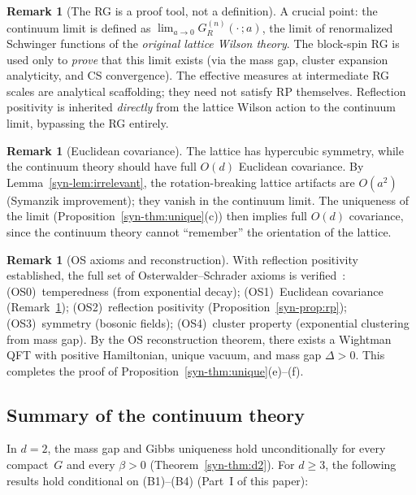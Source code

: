 \documentclass[11pt]{article}
\theoremstyle{definition}
\newtheorem{remark}[theorem]{Remark}
\begin{document}
\begin{remark}[The RG is a proof tool, not a definition]
\label{syn-rem:rg_tool}
A crucial point: the continuum limit is defined as
$\lim_{a \to 0} G_R^{(n)}(\cdot\,;a)$, the limit
of renormalized Schwinger functions of the
\emph{original lattice Wilson theory}.  The block-spin RG
is used only to \emph{prove} that this limit exists
(via the mass gap, cluster expansion analyticity, and CS
convergence).  The effective measures at intermediate RG
scales are analytical scaffolding; they need not satisfy
RP themselves.  Reflection positivity is inherited
\emph{directly} from the lattice Wilson action to the
continuum limit, bypassing the RG entirely.
\end{remark}

\begin{remark}[Euclidean covariance]
\label{syn-rem:euclidean}
The lattice has hypercubic symmetry, while the continuum
theory should have full $O(d)$ Euclidean covariance.
By Lemma~\ref{syn-lem:irrelevant}, the rotation-breaking
lattice artifacts are $O(a^2)$ (Symanzik improvement);
they vanish in the continuum limit.  The uniqueness of
the limit (Proposition~\ref{syn-thm:unique}(c)) then implies
full $O(d)$ covariance, since the continuum theory cannot
``remember'' the orientation of the lattice.
\end{remark}

\begin{remark}[OS axioms and reconstruction]
\label{syn-rem:os}
With reflection positivity established, the full set of
Osterwalder--Schrader axioms is
verified~\cite{OsterwalderSchrader}:
\textup{(OS0)}~temperedness (from exponential decay);
\textup{(OS1)}~Euclidean covariance (Remark~\ref{syn-rem:euclidean});
\textup{(OS2)}~reflection positivity (Proposition~\ref{syn-prop:rp});
\textup{(OS3)}~symmetry (bosonic fields);
\textup{(OS4)}~cluster property (exponential clustering from
mass gap).
By the OS reconstruction theorem, there exists a
Wightman QFT with positive Hamiltonian, unique vacuum, and
mass gap $\Delta > 0$.  This completes the proof of
Proposition~\ref{syn-thm:unique}(e)--(f).
\end{remark}

\subsection{Summary of the continuum theory}

In $d = 2$, the mass gap and Gibbs uniqueness hold
unconditionally for every compact~$G$ and every
$\beta > 0$ (Theorem~\ref{syn-thm:d2}).  For $d \geq 3$,
the following results hold conditional on
(B1)--(B4) (Part~I of this paper):
\end{document}
